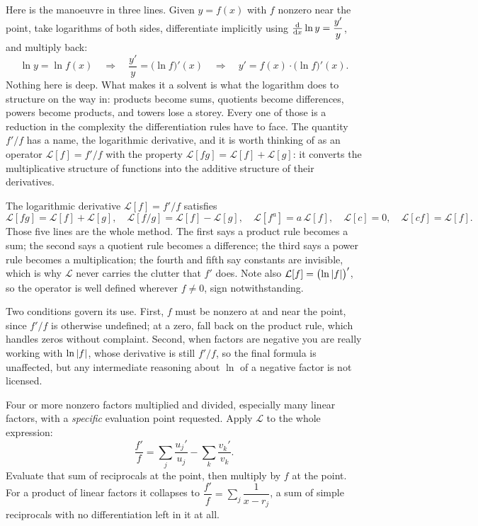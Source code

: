 Here is the manoeuvre in three lines. Given $y=f(x)$ with $f$ nonzero near the point, take logarithms of both sides, differentiate implicitly using $\frac{\mathrm{d}}{\mathrm{d}x}\ln y=\dfrac{y'}{y}$, and multiply back:
\[
\ln y=\ln f(x)\quad\Longrightarrow\quad \frac{y'}{y}=\bigl(\ln f\bigr)'(x)\quad\Longrightarrow\quad y'=f(x)\cdot\bigl(\ln f\bigr)'(x).
\]
Nothing here is deep. What makes it a solvent is what the logarithm does to structure on the way in: products become sums, quotients become differences, powers become products, and towers lose a storey. Every one of those is a reduction in the complexity the differentiation rules have to face. The quantity $f'/f$ has a name, the logarithmic derivative, and it is worth thinking of as an operator $\mathcal{L}[f]=f'/f$ with the property $\mathcal{L}[fg]=\mathcal{L}[f]+\mathcal{L}[g]$: it converts the multiplicative structure of functions into the additive structure of their derivatives.

\begin{keynote}
The logarithmic derivative $\mathcal{L}[f]=f'/f$ satisfies
\[
\mathcal{L}[fg]=\mathcal{L}[f]+\mathcal{L}[g],\quad
\mathcal{L}[f/g]=\mathcal{L}[f]-\mathcal{L}[g],\quad
\mathcal{L}[f^{a}]=a\,\mathcal{L}[f],\quad
\mathcal{L}[c]=0,\quad
\mathcal{L}[cf]=\mathcal{L}[f].
\]
Those five lines are the whole method. The first says a product rule becomes a sum; the second says a quotient rule becomes a difference; the third says a power rule becomes a multiplication; the fourth and fifth say constants are invisible, which is why $\mathcal{L}$ never carries the clutter that $f'$ does. Note also $\mathcal{L}[f]=\bigl(\ln\left\lvert f\right\rvert\bigr)'$, so the operator is well defined wherever $f\neq0$, sign notwithstanding.
\end{keynote}

Two conditions govern its use. First, $f$ must be nonzero at and near the point, since $f'/f$ is otherwise undefined; at a zero, fall back on the product rule, which handles zeros without complaint. Second, when factors are negative you are really working with $\ln\left\lvert f\right\rvert$, whose derivative is still $f'/f$, so the final formula is unaffected, but any intermediate reasoning about $\ln$ of a negative factor is not licensed.

\cue Four or more nonzero factors multiplied and divided, especially many linear factors, with a \emph{specific} evaluation point requested.
\method Apply $\mathcal{L}$ to the whole expression:
\[
\frac{f'}{f}=\sum_{j}\frac{u_{j}'}{u_{j}}-\sum_{k}\frac{v_{k}'}{v_{k}} .
\]
Evaluate that sum of reciprocals at the point, then multiply by $f$ at the point. For a product of linear factors it collapses to $\dfrac{f'}{f}=\sum_{j}\dfrac{1}{x-r_{j}}$, a sum of simple reciprocals with no differentiation left in it at all.


